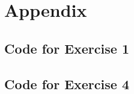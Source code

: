 \documentclass[12pt]{article}
\begin{document}
\section*{Appendix}\label{appendix}
\subsection*{Code for Exercise 1}

\subsection*{Code for Exercise 4}

\end{document}
